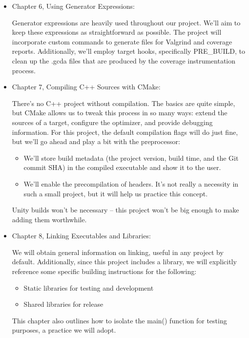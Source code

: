 \begin{itemize}
\item
Chapter 6, Using Generator Expressions:

Generator expressions are heavily used throughout our project. We’ll aim to keep these expressions as straightforward as possible. The project will incorporate custom commands to generate files for Valgrind and coverage reports. Additionally, we’ll employ target hooks, specifically PRE\_BUILD, to clean up the .gcda files that are produced by the coverage instrumentation process.

\item
Chapter 7, Compiling C++ Sources with CMake:

There’s no C++ project without compilation. The basics are quite simple, but CMake allows us to tweak this process in so many ways: extend the sources of a target, configure the optimizer, and provide debugging information. For this project, the default compilation flags will do just fine, but we’ll go ahead and play a bit with the preprocessor:

\begin{itemize}
\item
We’ll store build metadata (the project version, build time, and the Git commit SHA) in the compiled executable and show it to the user.

\item
We’ll enable the precompilation of headers. It’s not really a necessity in such a small project, but it will help us practice this concept.
\end{itemize}

Unity builds won’t be necessary – this project won’t be big enough to make adding them worthwhile.

\item
Chapter 8, Linking Executables and Libraries:

We will obtain general information on linking, useful in any project by default. Additionally, since this project includes a library, we will explicitly reference some specific building instructions for the following:

\begin{itemize}
\item
Static libraries for testing and development

\item
Shared libraries for release
\end{itemize}

This chapter also outlines how to isolate the main() function for testing purposes, a practice we will adopt.


\end{itemize}
